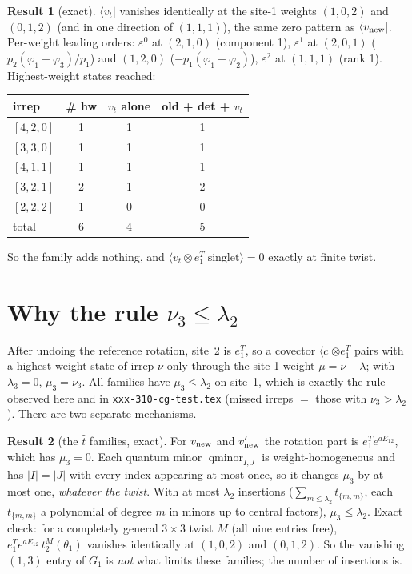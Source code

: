 \documentclass[11pt]{article}
\newcommand{\nb}[1]{\texttt{#1}}
\theoremstyle{definition}
\newtheorem{result}{Result}
\theoremstyle{remark}
\begin{document}
\begin{result}[exact]\label{res:t21}
$\langle v_t|$ vanishes identically at the site-1 weights $(1,0,2)$ and $(0,1,2)$ (and in one direction of $(1,1,1)$), the same zero pattern as $\langle v_{\rm new}|$. Per-weight leading orders: $\varepsilon^0$ at $(2,1,0)$ (component 1), $\varepsilon^1$ at $(2,0,1)$ ($p_2(\varphi_1-\varphi_3)/p_1$) and $(1,2,0)$ ($-p_1(\varphi_1-\varphi_2)$), $\varepsilon^2$ at $(1,1,1)$ (rank 1). Highest-weight states reached:
\begin{center}
\begin{tabular}{lccc}\toprule
irrep & \# hw & $v_t$ alone & old + det + $v_t$\\\midrule
$[4,2,0]$ & 1 & 1 & 1\\
$[3,3,0]$ & 1 & 1 & 1\\
$[4,1,1]$ & 1 & 1 & 1\\
$[3,2,1]$ & 2 & 1 & 2\\
$[2,2,2]$ & 1 & 0 & 0\\\midrule
total & 6 & 4 & 5\\\bottomrule
\end{tabular}
\end{center}
So the family adds nothing, and $\langle v_t\otimes e_1^T|\text{singlet}\rangle=0$ exactly at finite twist.
\end{result}

\section{Why the rule $\nu_3\le\lambda_2$}\label{sec:why}

After undoing the reference rotation, site~2 is $e_1^T$, so a covector $\langle c|\otimes e_1^T$ pairs with a highest-weight state of irrep $\nu$ only through the site-1 weight $\mu=\nu-\lambda$; with $\lambda_3=0$, $\mu_3=\nu_3$. All families have $\mu_3\le\lambda_2$ on site~1, which is exactly the rule observed here and in \nb{xxx-310-cg-test.tex} (missed irreps $=$ those with $\nu_3>\lambda_2$). There are two separate mechanisms.

\begin{result}[the $\hat t$ families, exact]\label{res:whyA}
For $v_{\rm new}$ and $v'_{\rm new}$ the rotation part is $e_1^Te^{aE_{12}}$, which has $\mu_3=0$. Each quantum minor $\operatorname{qminor}_{I,J}$ is weight-homogeneous and has $|I|=|J|$ with every index appearing at most once, so it changes $\mu_3$ by at most one, \emph{whatever the twist}. With at most $\lambda_2$ insertions ($\sum_{m\le\lambda_2}t_{\{m,m\}}$, each $t_{\{m,m\}}$ a polynomial of degree $m$ in minors up to central factors), $\mu_3\le\lambda_2$. Exact check: for a completely general $3\times3$ twist $M$ (all nine entries free), $e_1^Te^{aE_{12}}\,t^M_2(\theta_1)$ vanishes identically at $(1,0,2)$ and $(0,1,2)$. So the vanishing $(1,3)$ entry of $G_1$ is \emph{not} what limits these families; the number of insertions is.
\end{result}
\end{document}
